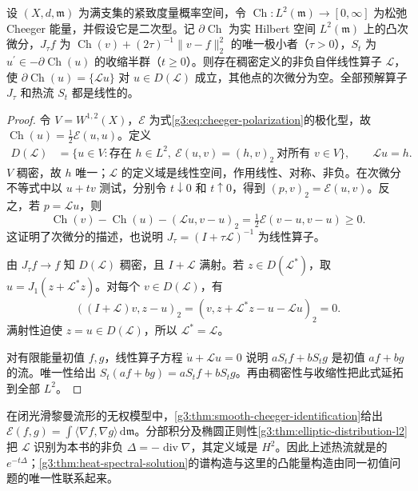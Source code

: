 \begin{proposition}\label{g3:prop:C-quadratic-linear-heat}
	设 \((X,d,\mathfrak m)\) 为满支集的紧致度量概率空间，令 \(\operatorname{Ch}:L^2(\mathfrak m)\to[0,\infty]\) 为松弛 Cheeger 能量，并假设它是二次型。记 \(\partial\operatorname{Ch}\) 为实 Hilbert 空间 \(L^2(\mathfrak m)\) 上的凸次微分，\(J_\tau f\) 为 \(\operatorname{Ch}(v)+(2\tau)^{-1}\|v-f\|_2^2\) 的唯一极小者（\(\tau>0\)），\(S_t\) 为 \(u^\prime\in-\partial\operatorname{Ch}(u)\) 的收缩半群（\(t\ge0\)）。则存在稠密定义的非负自伴线性算子 \(\mathcal L\)，使 \(\partial\operatorname{Ch}(u)=\{\mathcal Lu\}\) 对 \(u\in D(\mathcal L)\) 成立，其他点的次微分为空。全部预解算子 \(J_\tau\) 和热流 \(S_t\) 都是线性的。
\end{proposition}
\begin{proof}
	令 \(V=W^{1,2}(X)\)，\(\mathcal E\) 为式\eqref{g3:eq:cheeger-polarization}的极化型，故 \(\operatorname{Ch}(u)=\tfrac12\mathcal E(u,u)\)。定义
	\[
	\begin{split}
		D(\mathcal L)&=\{u\in V:\text{存在 }h\in L^2,
													\ \mathcal E(u,v)=(h,v)_2\ \text{对所有 }v\in V\},\qquad \mathcal Lu=h.
	\end{split}
	\]
	\(V\) 稠密，故 \(h\) 唯一；\(\mathcal L\) 的定义域是线性空间，作用线性、对称、非负。在次微分不等式中以 \(u+tv\) 测试，分别令 \(t\downarrow0\) 和 \(t\uparrow0\)，得到 \((p,v)_2=\mathcal E(u,v)\)。反之，若 \(p=\mathcal Lu\)，则
	\[
		\operatorname{Ch}(v)-\operatorname{Ch}(u)-(\mathcal Lu,v-u)_2
		=\tfrac12\mathcal E(v-u,v-u)\ge0.
	\]
	这证明了次微分的描述，也说明 \(J_\tau=(I+\tau\mathcal L)^{-1}\) 为线性算子。

	由 \(J_\tau f\to f\) 知 \(D(\mathcal L)\) 稠密，且 \(I+\mathcal L\) 满射。若 \(z\in D(\mathcal L^*)\)，取 \(u=J_1(z+\mathcal L^*z)\)。对每个 \(v\in D(\mathcal L)\)，有
	\[
		((I+\mathcal L)v,z-u)_2=(v,z+\mathcal L^*z-u-\mathcal Lu)_2=0.
	\]
	满射性迫使 \(z=u\in D(\mathcal L)\)，所以 \(\mathcal L^*=\mathcal L\)。

	对有限能量初值 \(f,g\)，线性算子方程 \(\dot u+\mathcal Lu=0\) 说明 \(aS_tf+bS_tg\) 是初值 \(af+bg\) 的流。唯一性给出 \(S_t(af+bg)=aS_tf+bS_tg\)。再由稠密性与收缩性把此式延拓到全部 \(L^2\)。
\end{proof}

在闭光滑黎曼流形的无权模型中，\cref{g3:thm:smooth-cheeger-identification}给出 \(\mathcal E(f,g)=\int\langle\nabla f,\nabla g\rangle\,\mathrm d\mathfrak m\)。分部积分及椭圆正则性\cref{g3:thm:elliptic-distribution-l2}把 \(\mathcal L\) 识别为本书的非负 \(\Delta=-\operatorname{div}\nabla\)，其定义域是 \(H^2\)。因此上述热流就是的 \(e^{-t\Delta}\)；\cref{g3:thm:heat-spectral-solution}的谱构造与这里的凸能量构造由同一初值问题的唯一性联系起来。

